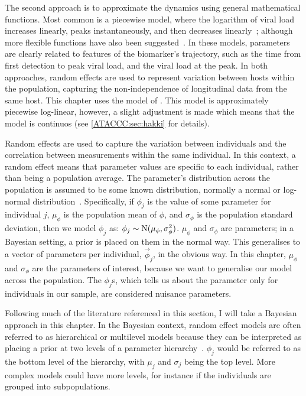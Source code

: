 \documentclass[thesis.tex]{subfiles}
\begin{document}
The second approach is to approximate the dynamics using general mathematical functions.
Most common is a piecewise model, where the logarithm of viral load increases linearly, peaks instantaneously, and then decreases linearly~\autocites{clearyUsing,kisslerViral,larremoreTest}; although more flexible functions have also been suggested~\autocites{quiltyQuarantine}.
In these models, parameters are clearly related to features of the biomarker's trajectory, such as the time from first detection to peak viral load, and the viral load at the peak.
In both approaches, random effects are used to represent variation between hosts within the population, capturing the non-independence of longitudinal data from the same host.
This chapter uses the model of \textcite{hakkiOnset}.
This model is approximately piecewise log-linear, however, a slight adjustment is made which means that the model is continuos (see \cref{ATACCC:sec:hakki} for details).

Random effects are used to capture the variation between individuals and the correlation between measurements within the same individual.
In this context, a random effect means that parameter values are specific to each individual, rather than being a population average.
The parameter's distribution across the population is assumed to be some known distribution, normally a normal or log-normal distribution~\autocite[chapter 24]{lashModern}.
Specifically, if $\phi_j$ is the value of some parameter for individual $j$, $\mu_\phi$ is the population mean of $\phi$, and $\sigma_\phi$ is the population standard deviation, then we model $\phi_j$ as: $\phi_j \sim \operatorname{N}(\mu_\phi, \sigma_\phi^2)$.
$\mu_\phi$ and $\sigma_\phi$ are parameters; in a Bayesian setting, a prior is placed on them in the normal way.
This generalises to a vector of parameters per individual, $\vec{\phi}_j$, in the obvious way.
In this chapter, $\mu_\phi$ and $\sigma_\phi$ are the parameters of interest, because we want to generalise our model across the population.
The $\phi_j$s, which tells us about the parameter only for individuals in our sample, are considered nuisance parameters.

Following much of the literature referenced in this section, I will take a Bayesian approach in this chapter.
In the Bayesian context, random effect models are often referred to as hierarchical or multilevel models because they can be interpreted as placing a prior at two levels of a parameter hierarchy~\autocite[chapter 5]{gelmanBDA}.
$\phi_j$ would be referred to as the bottom level of the hierarchy, with $\mu_j$ and $\sigma_j$ being the top level.
More complex models could have more levels, for instance if the individuals are grouped into subpopulations.
\end{document}

